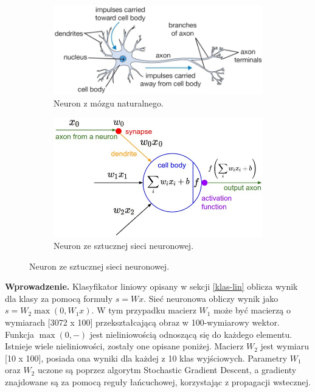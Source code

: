 \documentclass[a4paper,11pt, notitlepage, twosides, openany ]{report}
\begin{document}
	\begin{figure}[h!]
        \centering
        \begin{subfigure}{.5\textwidth}
          \centering
          \includegraphics[width=.95\linewidth]{brain.png}
          \caption{Neuron z mózgu naturalnego.}
          \label{fig:sub1}
        \end{subfigure}%
        \begin{subfigure}{.5\textwidth}
          \centering
          \includegraphics[width=0.95\linewidth]{neuron_model.jpeg}
          \caption{Neuron ze sztucznej sieci neuronowej.}
          \label{fig:sub2}
        \end{subfigure}
        \label{fig:vs}
	\end{figure}
	
	\textbf{Wprowadzenie.} Klasyfikator liniowy opisany w sekcji \ref{klas-lin} oblicza wynik dla klasy za pomocą formuły $s = Wx$. Sieć neuronowa obliczy wynik jako $s = W_2 \max(0, W_1 x)$. W tym przypadku macierz $W_1$ może być macierzą o wymiarach [3072 x 100] przekształcającą obraz w 100-wymiarowy wektor. Funkcja $\max(0,-)$ jest nieliniowością odnoszącą się do każdego elementu. Istnieje wiele nieliniowości, zostały one opisane poniżej. Macierz $W_2$ jest wymiaru [10 x 100], posiada ona wyniki dla każdej z 10 klas wyjściowych. Parametry $W_1$ oraz $W_2$ uczone są poprzez algorytm Stochastic Gradient Descent, a gradienty znajdowane są za pomocą reguły łańcuchowej, korzystając z propagacji wstecznej. 
	
\end{document}
